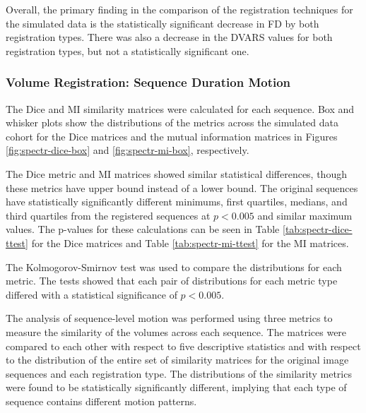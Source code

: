 Overall, the primary finding in the comparison of the registration techniques for the simulated data is the statistically significant decrease in FD by both registration types. There was also a decrease in the DVARS values for both registration types, but not a statistically significant one.


\subsubsection{Volume Registration: Sequence Duration Motion}

The Dice and MI similarity matrices were calculated for each sequence. Box and whisker plots show the distributions of the metrics across the simulated data cohort for the Dice matrices and the mutual information matrices in Figures \ref{fig:spectr-dice-box} and \ref{fig:spectr-mi-box}, respectively.  

The Dice metric and MI matrices showed similar statistical differences, though these metrics have upper bound instead of a lower bound. The original sequences have statistically significantly different minimums, first quartiles, medians, and third quartiles from the registered sequences at $p < 0.005$ and similar maximum values. The p-values for these calculations can be seen in Table \ref{tab:spectr-dice-ttest} for the Dice matrices and Table \ref{tab:spectr-mi-ttest} for the MI matrices. 

The Kolmogorov-Smirnov test was used to compare the distributions for each metric. The tests showed that each pair of distributions for each metric type differed with a statistical significance of $p < 0.005$.

The analysis of sequence-level motion was performed using three metrics to measure the similarity of the volumes across each sequence. The matrices were compared to each other with respect to five descriptive statistics and with respect to the distribution of the entire set of similarity matrices for the original image sequences and each registration type. The distributions of the similarity metrics were found to be statistically significantly different, implying that each type of sequence contains different motion patterns.

